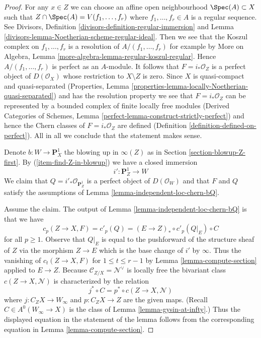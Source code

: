 \begin{proof}
For any $x \in Z$ we can choose an affine open neighbourhood
$\Spec(A) \subset X$ such that $Z \cap \Spec(A) = V(f_1, \ldots, f_r)$
where $f_1, \ldots, f_r \in A$ is a regular sequence.
See Divisors, Definition \ref{divisors-definition-regular-immersion} and
Lemma \ref{divisors-lemma-Noetherian-scheme-regular-ideal}.
Then we see that the Koszul complex on $f_1, \ldots, f_r$ is
a resolution of $A/(f_1, \ldots, f_r)$ for example by
More on Algebra, Lemma \ref{more-algebra-lemma-regular-koszul-regular}.
Hence $A/(f_1, \ldots, f_r)$ is perfect as an $A$-module.
It follows that $F = i_*\mathcal{O}_Z$ is a perfect object of
$D(\mathcal{O}_X)$ whose restriction to $X \setminus Z$ is zero.
Since $X$ is quasi-compact and quasi-separated
(Properties, Lemma \ref{properties-lemma-locally-Noetherian-quasi-separated})
and has the resolution property we see that $F = i_*\mathcal{O}_Z$ can be
represented by a bounded complex of finite locally free modules
(Derived Categories of Schemes, Lemma
\ref{perfect-lemma-construct-strictly-perfect}) and hence
the Chern classes of $F = i_*\mathcal{O}_Z$ are defined
(Definition \ref{definition-defined-on-perfect}). All in all
we conclude that the statement makes sense.

\medskip\noindent
Denote $b : W \to \mathbf{P}^1_X$ the blowing up in $\infty(Z)$
as in Section \ref{section-blowup-Z-first}. By (\ref{item-find-Z-in-blowup})
we have a closed immersion
$$
i' : \mathbf{P}^1_Z \longrightarrow W
$$
We claim that $Q = i'_*\mathcal{O}_{\mathbf{P}^1_Z}$
is a perfect object of
$D(\mathcal{O}_W)$ and that $F$ and $Q$ satisfy the assumptions of
Lemma \ref{lemma-independent-loc-chern-bQ}.

\medskip\noindent
Assume the claim. The output of Lemma \ref{lemma-independent-loc-chern-bQ}
is that we have
$$
c_p(Z \to X, F) = c'_p(Q) = (E \to Z)_* \circ c'_p(Q|_E) \circ C
$$
for all $p \geq 1$. Observe that $Q|_E$ is equal to the pushforward of
the structure sheaf of $Z$ via the morphism $Z \to E$ which is the
base change of $i'$ by $\infty$.
Thus the vanishing of $c_t(Z \to X, F)$ for $1 \leq t \leq r - 1$
by Lemma \ref{lemma-compute-section} applied to $E \to Z$.
Because $\mathcal{C}_{Z/X} = \mathcal{N}^\vee$
is locally free the bivariant class $c(Z \to X, \mathcal{N})$
is characterized by the relation
$$
j^* \circ C = p^* \circ c(Z \to X, \mathcal{N})
$$
where $j : C_ZX \to W_\infty$ and $p : C_ZX \to Z$ are the given maps.
(Recall $C \in A^0(W_\infty \to X)$ is the class of
Lemma \ref{lemma-gysin-at-infty}.)
Thus the displayed equation in the statement of the lemma
follows from the corresponding equation in Lemma \ref{lemma-compute-section}.


\end{proof}
